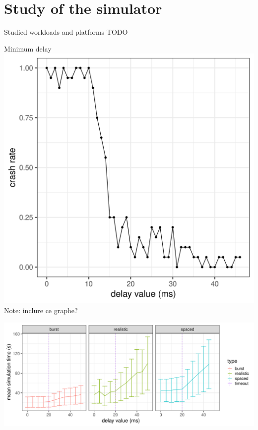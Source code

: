 \documentclass[12pt, aspectratio=43]{beamer}
\begin{document}
\section{Study of the simulator}
\begin{frame}{Studied workloads and platforms}
	TODO
\end{frame}

\begin{frame}[allowframebreaks]{Minimum delay}
	\centering
	\includegraphics[scale=0.3]{../imgs/min-delay_crash_old.png}\\
	Note: inclure ce graphe?

	\includegraphics[width=\textwidth]{../imgs/min-delay_duration.png}
\end{frame}
\end{document}
